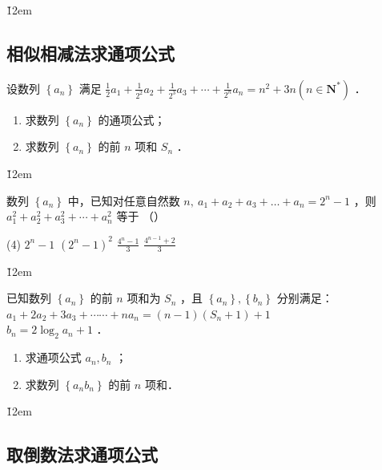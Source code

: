 \v{12em}

\subsection{相似相减法求通项公式}

\begin{example}
    设数列 $\left\{a_n\right\}$ 满足 $\frac{1}{2} a_1+\frac{1}{2^2} a_2+\frac{1}{2^3} a_3+\cdots+\frac{1}{2^n} a_n=n^2+3 n\left(n \in \mathbf{N}^*\right)$ ．
    \begin{enumerate}
        \item 求数列 $\left\{a_n\right\}$ 的通项公式；

        \item 求数列 $\left\{a_n\right\}$ 的前 $n$ 项和 $S_n$ ．
    \end{enumerate}
\end{example}

\v{12em}

\begin{example}
    数列 $\left\{a_n\right\}$ 中，已知对任意自然数 $n, ~ a_1+a_2+a_3+\ldots+a_n=2^n-1$ ，则 $a_1^2+a_2^2+a_3^2+\cdots+a_n^2$ 等于 （\qquad）
    \begin{tasks}(4)
        \task $2^n-1$
        \task $\left(2^n-1\right)^2$
        \task $\frac{4^n-1}{3}$
        \task $\frac{4^{n-1}+2}{3}$
    \end{tasks}
\end{example}

\v{12em}

\begin{example}
    已知数列 $\left\{a_n\right\}$ 的前 $n$ 项和为 $S_n$ ，且 $\left\{a_n\right\},\left\{b_n\right\}$ 分别满足：$a_1+2 a_2+3 a_3+\cdots \cdots+n a_n=(n-1)\left(S_n+1\right)+1$ \\ $b_n=2 \log _2 a_n+1$ ．
    \begin{enumerate}
        \item 求通项公式 $a_n, b_n$ ；

        \item 求数列 $\left\{a_n b_n\right\}$ 的前 $n$ 项和．
    \end{enumerate}
\end{example}

\v{12em}

\subsection{取倒数法求通项公式}

